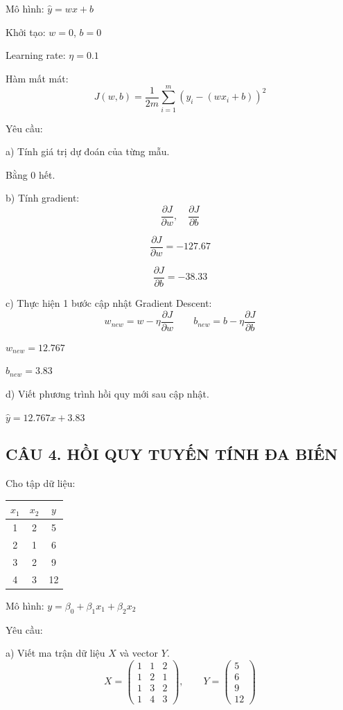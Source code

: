 \documentclass[a4paper,12pt]{article}
\begin{document}
Mô hình: $\hat{y} = wx + b$

Khởi tạo: $w = 0$, $b = 0$

Learning rate: $\eta = 0.1$

Hàm mất mát:
\[ J(w,b) = \frac{1}{2m}\sum_{i=1}^{m}(y_i - (wx_i + b))^2 \]

Yêu cầu:

a) Tính giá trị dự đoán của từng mẫu.

Bằng 0 hết.

b) Tính gradient:
\[ \frac{\partial J}{\partial w}, \quad \frac{\partial J}{\partial b} \]

\[ \frac{\partial J}{\partial w} = -127.67 \]

\[ \frac{\partial J}{\partial b} = -38.33 \]

c) Thực hiện 1 bước cập nhật Gradient Descent:
\[ w_{new} = w - \eta\frac{\partial J}{\partial w} \qquad
   b_{new} = b - \eta\frac{\partial J}{\partial b} \]

$w_{new} = 12.767$

$b_{new} = 3.83$

d) Viết phương trình hồi quy mới sau cập nhật.

$\hat{y} = 12.767x + 3.83$

\subsection*{CÂU 4. HỒI QUY TUYẾN TÍNH ĐA BIẾN}

Cho tập dữ liệu:
\begin{center}
\begin{tabular}{|c|c|c|}
\hline
$x_1$ & $x_2$ & $y$ \\
\hline
1 & 2 & 5 \\
2 & 1 & 6 \\
3 & 2 & 9 \\
4 & 3 & 12 \\
\hline
\end{tabular}
\end{center}

Mô hình: $y = \beta_0 + \beta_1 x_1 + \beta_2 x_2$

Yêu cầu:

a) Viết ma trận dữ liệu $X$ và vector $Y$.
\[ X = \begin{pmatrix}
1 & 1 & 2 \\
1 & 2 & 1 \\
1 & 3 & 2 \\
1 & 4 & 3
\end{pmatrix}, \qquad
Y = \begin{pmatrix} 5 \\ 6 \\ 9 \\ 12 \end{pmatrix} \]
\end{document}
